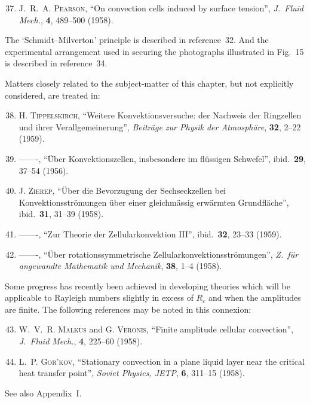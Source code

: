 \begin{enumerate}
\setcounter{enumi}{36}

\item J.~R.~A. \textsc{Pearson}, ``On convection cells induced by surface tension'',
  \textit{J.\ Fluid Mech.}, \textbf{4}, 489--500 (1958).

\end{enumerate}

\noindent The `Schmidt--Milverton' principle is described in reference~32. And the experimental
arrangement used in securing the photographs illustrated in Fig.~15 is
described in reference~34.

\medskip

\noindent Matters closely related to the subject-matter of this chapter, but not explicitly
considered, are treated in:

\begin{enumerate}
\setcounter{enumi}{37}

\item H. \textsc{Tippelskirch}, ``Weitere Konvektionsversuche: der Nachweis der
  Ringzellen und ihrer Verallgemeinerung'', \textit{Beitr\"age zur Physik der
  Atmosph\"are}, \textbf{32}, 2--22 (1959).

\item -------, ``\"Uber Konvektionszellen, insbesondere im fl\"ussigen Schwefel'',
  ibid.\ \textbf{29}, 37--54 (1956).

\item J. \textsc{Zierep}, ``\"Uber die Bevorzugung der Sechseckzellen bei Konvektionsstr\"omungen
  \"uber einer gleichm\"assig erw\"armten Grundfl\"ache'', ibid.\ \textbf{31}, 31--39
  (1958).

\item -------, ``Zur Theorie der Zellularkonvektion III'', ibid.\ \textbf{32}, 23--33 (1959).

\item -------, ``\"Uber rotationssymmetrische Zellularkonvektionsstr\"omungen'',
  \textit{Z.\ f\"ur angewandte Mathematik und Mechanik}, \textbf{38}, 1--4 (1958).

\end{enumerate}

\noindent Some progress has recently been achieved in developing theories which will be
applicable to Rayleigh numbers slightly in excess of $R_c$ and when the amplitudes
are finite. The following references may be noted in this connexion:

\begin{enumerate}
\setcounter{enumi}{42}

\item W.~V.~R. \textsc{Malkus} and G. \textsc{Veronis}, ``Finite amplitude cellular convection'',
  \textit{J.\ Fluid Mech.}, \textbf{4}, 225--60 (1958).

\item L.~P. \textsc{Gor'kov}, ``Stationary convection in a plane liquid layer near the
  critical heat transfer point'', \textit{Soviet Physics, JETP}, \textbf{6}, 311--15 (1958).

\end{enumerate}

\noindent See also Appendix~I.
